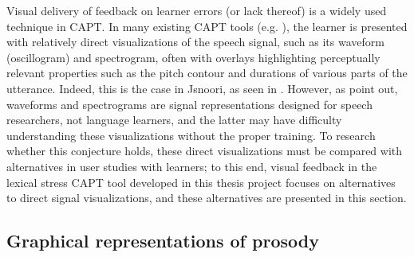 	Visual delivery of feedback on learner errors (or lack thereof) is a widely used technique in CAPT.
	In many existing CAPT tools %
	(e.g. \cite{Martin2004,Henry2007}),
the learner is presented with relatively direct visualizations of the speech signal, such as its waveform (oscillogram) and spectrogram, often with overlays highlighting perceptually relevant properties such as the pitch contour and durations of various parts of the utterance. 
	Indeed, this is the case in Jsnoori, as seen in .
	However, as \textcite{Neri2002} point out, waveforms and spectrograms are signal representations designed for speech researchers, not language learners, and the latter may have difficulty understanding these visualizations without the proper training. To research whether this conjecture holds, these direct visualizations must be compared with alternatives in user studies with learners; to this end, visual feedback in the lexical stress CAPT tool developed in this thesis project focuses on alternatives to direct signal visualizations, 
	and these alternatives are presented in this section.
	
	
	\subsection{Graphical representations of prosody}
	\label{sec:visual:graphical}
	


	
